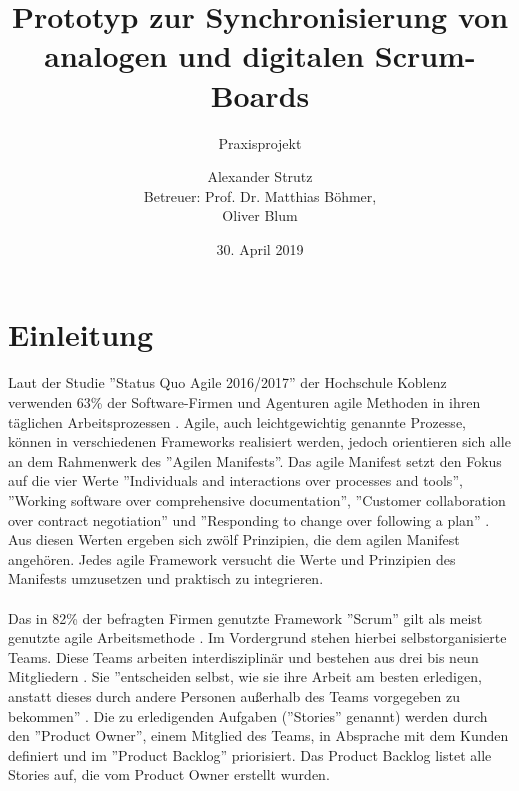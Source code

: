 \documentclass[12pt,titlepage]{scrartcl}
\begin{document}
	\begin{titlepage}
		\title{\glqq Prototyp zur Synchronisierung von analogen und digitalen Scrum-Boards\grqq{}} 
		\subtitle{Praxisprojekt}
		\author{Alexander Strutz \vspace{0.5cm}\\ Betreuer: 
		Prof. Dr. Matthias Böhmer,\\Oliver Blum}
 		\date{30. April 2019}
		\maketitle
	\end{titlepage}
	
	\tableofcontents
	
	\newpage
	\section{Einleitung} \label{Einleitung}
		Laut der Studie ''Status Quo Agile 2016/2017'' der Hochschule Koblenz verwenden 63\% der Software-Firmen und Agenturen agile Methoden in ihren täglichen Arbeitsprozessen \cite{hskob}. Agile, auch leichtgewichtig genannte Prozesse, können in verschiedenen Frameworks realisiert werden, jedoch orientieren sich alle an dem Rahmenwerk des ''Agilen Manifests''. Das agile Manifest setzt den Fokus auf die vier Werte ''Individuals and interactions over processes and tools'', ''Working software over comprehensive documentation'', ''Customer collaboration over contract negotiation'' und ''Responding to change over following a plan'' \cite{manifest}. Aus diesen Werten ergeben sich zwölf Prinzipien, die dem agilen Manifest angehören. Jedes agile Framework versucht die Werte und Prinzipien des Manifests umzusetzen und praktisch zu integrieren. \\ \\
		Das in 82\% der befragten Firmen genutzte Framework ''Scrum'' gilt als meist genutzte agile Arbeitsmethode \cite{hskob}. Im Vordergrund stehen hierbei selbstorganisierte Teams. Diese Teams arbeiten interdisziplinär und bestehen aus drei bis neun Mitgliedern \cite{guide}. Sie ''entscheiden selbst, wie sie ihre Arbeit am besten erledigen, anstatt dieses durch andere Personen außerhalb des Teams vorgegeben zu bekommen'' \cite{guide}. Die zu erledigenden Aufgaben (''Stories'' genannt) werden durch den ''Product Owner'', einem Mitglied des Teams, in Absprache mit dem Kunden definiert und im ''Product Backlog'' priorisiert. Das Product Backlog listet alle Stories auf, die vom Product Owner erstellt wurden.\\ \\
\end{document}
